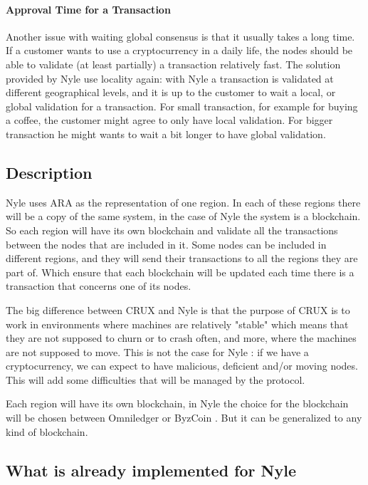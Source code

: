 \documentclass[a4paper,11pt,oneside]{report}
\begin{document}
\paragraph{Approval Time for a Transaction} \label{approve_time} Another issue
with waiting global consensus is that it usually takes a long time. If a
customer wants to use a cryptocurrency in a daily life, the nodes should be 
able to validate (at least partially) a transaction relatively fast. The
solution provided by Nyle use locality again: with Nyle a transaction is
validated at different geographical levels, and it is up to the customer to wait a local, or
global validation for a transaction. For small transaction, for example for
buying a coffee, the customer might agree to only have local validation. For
bigger transaction he might wants to wait a bit longer to have global
validation.

\subsection{Description}

Nyle uses ARA as the representation of one region. In each of these regions
there will be a copy of the same system, in the case of Nyle the system is a
blockchain. So each region will have its own blockchain and validate all the
transactions between the nodes that are included in it. Some nodes can be
included in different regions, and they will send their transactions to all the
regions they are part of. Which ensure that each blockchain will be updated
each time there is a transaction that concerns one of its nodes.

The big difference between CRUX \cite{Basescu2014} and Nyle is that the purpose
of CRUX \cite{Basescu2014} is to work in environments where machines are
relatively "stable" which means that they are not supposed to churn or to crash
often, and more, where the machines are not supposed to move. This is not the
case for Nyle : if we have a cryptocurrency, we can expect to have malicious,
deficient and/or moving nodes.  This will add some difficulties that will be
managed by the protocol.

Each region will have its own blockchain, in Nyle the choice for the blockchain
will be chosen between Omniledger \cite{Kokoris-Kogias2017} or ByzCoin
\cite{Kogias2016}. But it can be generalized to any kind of blockchain.

\subsection{What is already implemented for Nyle} 
\end{document}
